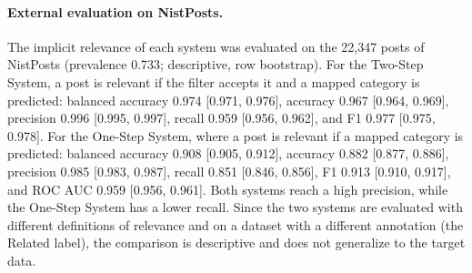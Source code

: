 \paragraph{External evaluation on NistPosts.} The implicit relevance of each system was evaluated on the 22,347 posts of NistPosts (prevalence 0.733; descriptive, row bootstrap). For the Two-Step System, a post is relevant if the filter accepts it and a mapped category is predicted: balanced accuracy 0.974 [0.971, 0.976], accuracy 0.967 [0.964, 0.969], precision 0.996 [0.995, 0.997], recall 0.959 [0.956, 0.962], and F1 0.977 [0.975, 0.978]. For the One-Step System, where a post is relevant if a mapped category is predicted: balanced accuracy 0.908 [0.905, 0.912], accuracy 0.882 [0.877, 0.886], precision 0.985 [0.983, 0.987], recall 0.851 [0.846, 0.856], F1 0.913 [0.910, 0.917], and ROC AUC 0.959 [0.956, 0.961]. Both systems reach a high precision, while the One-Step System has a lower recall. Since the two systems are evaluated with different definitions of relevance and on a dataset with a different annotation (the Related label), the comparison is descriptive and does not generalize to the target data.
